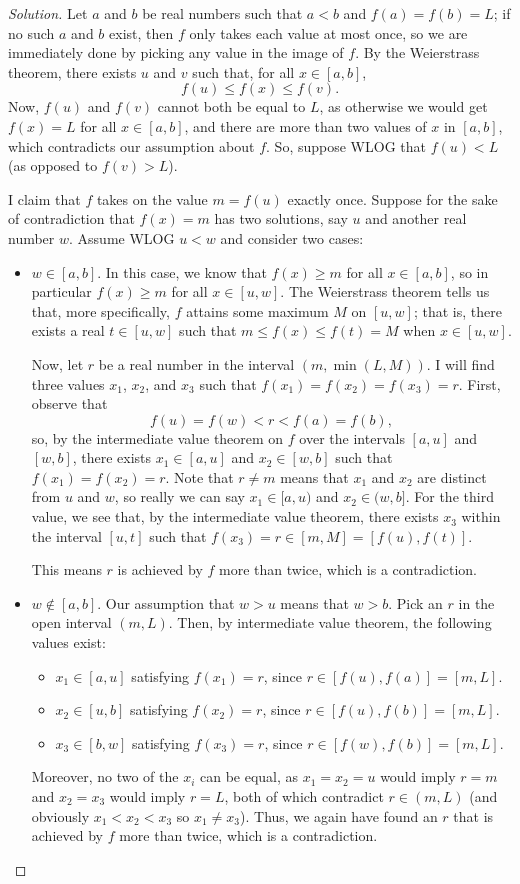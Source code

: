 \documentclass[11pt]{scrartcl}
\providecommand{\ii}{\item}
\theoremstyle{problem}
\theoremstyle{remark}
\newenvironment{soln}{\begin{proof}[Solution]}{\end{proof}}
\begin{document}
\begin{soln}
	Let $a$ and $b$ be real numbers such that $a < b$ and
	$f(a) = f(b) = L$; if no such $a$ and $b$ exist,
	then $f$ only takes each value at most once,
	so we are immediately done by picking any value
	in the image of $f$.
	By the Weierstrass theorem, there exists $u$ and $v$ such that,
	for all $x\in[a, b]$,
	\[f(u) \le f(x) \le f(v).\]
	Now, $f(u)$ and $f(v)$ cannot both be equal to $L$,
	as otherwise we would get $f(x) = L$ for all $x\in[a, b]$,
	and there are more than two values of $x$ in $[a, b]$,
	which contradicts our assumption about $f$.
	So, suppose WLOG that $f(u) < L$ (as opposed to $f(v) > L$).
	
	I claim that $f$ takes on the value $m = f(u)$ exactly once.
	Suppose for the sake of contradiction that $f(x) = m$
	has two solutions, say $u$ and another real number $w$.
	Assume WLOG $u < w$ and consider two cases:
	\begin{itemize}
		\ii $w\in[a, b]$. In this case, we know that
		$f(x) \ge m$ for all $x\in[a, b]$, so in particular
		$f(x) \ge m$ for all $x\in[u, w]$.
		The Weierstrass theorem tells us that, more specifically,
		$f$ attains some maximum $M$ on $[u, w]$; that is,
		there exists a real $t\in[u, w]$ such that $m \le f(x) \le f(t) = M$
		when $x\in[u,w]$.
		
		Now, let $r$ be a real number in the interval $(m, \min(L, M))$.
		I will find three values $x_1$, $x_2$, and $x_3$ such that
		$f(x_1) = f(x_2) = f(x_3) = r$.
		First, observe that
		\[f(u) = f(w) < r < f(a) = f(b),\]
		so, by the intermediate value theorem on $f$ over the intervals $[a, u]$
		and $[w, b]$, there exists $x_1\in[a, u]$ and $x_2\in[w, b]$
		such that $f(x_1) = f(x_2) = r$.
		Note that $r\ne m$ means that $x_1$ and $x_2$ are distinct
		from $u$ and $w$, so really we can say $x_1 \in [a, u)$
		and $x_2\in (w, b]$.
		For the third value, we see that, by the intermediate value theorem,
		there exists $x_3$ within the interval $[u, t]$
		such that $f(x_3) = r\in[m, M] = [f(u), f(t)]$.
		
		This means $r$ is achieved by $f$ more than twice,
		which is a contradiction.
		
		\ii $w\notin[a, b]$. Our assumption that $w > u$ means that
		$w > b$. Pick an $r$ in the open interval $(m, L)$.
		Then, by intermediate value theorem, the following values exist:
		\begin{itemize}
			\ii[$\circ$] $x_1\in[a, u]$ satisfying $f(x_1) = r$, since
			$r\in[f(u), f(a)] = [m, L]$.
			\ii[$\circ$] $x_2\in[u, b]$ satisfying $f(x_2) = r$, since
			$r\in[f(u), f(b)] = [m, L]$.
			\ii[$\circ$] $x_3\in[b, w]$ satisfying $f(x_3) = r$, since
			$r\in[f(w), f(b)] = [m, L]$.
		\end{itemize}
		Moreover, no two of the $x_i$ can be equal, as
		$x_1 = x_2 = u$ would imply $r = m$ and $x_2 = x_3$ would imply
		$r = L$, both of which contradict $r\in(m, L)$
		(and obviously $x_1 < x_2 < x_3$ so $x_1\ne x_3$).
		Thus, we again have found an $r$ that is achieved by $f$
		more than twice, which is a contradiction.
	\end{itemize}


\end{soln}
\end{document}
